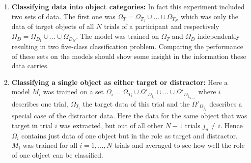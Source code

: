 \begin{enumerate}
	\item \textbf{Classifying data into object categories:} In fact this experiment included two sets of data. The first one was $ \Omega_{T} = \Omega_{T_{1}} \cup \hdots \cup \Omega_{T_{N}}$ which was only the data of target objects of all $ N $ trials of a participant and respectively $ \Omega_{D} = \Omega_{D_{1}} \cup \hdots \cup \Omega_{D_{N}}$. The model was trained on $ \Omega_{T} $ and $ \Omega_{D} $ independently resulting in two five-class classification problem. Comparing the performance of these sets on the models should show some insight in the information these data carries.
	
	\item \textbf{Classifying a single object as either target or distractor:} Here a model $ M_{i} $ was trained on a set $\Omega_{i} = \Omega_{T_{i}} \cup \Omega'_{D_{j_{1}}} \cup \hdots \cup \Omega'_{D_{j_{N-1}}} $ where $ i $ describes one trial, $ \Omega_{T_{i}} $ the target data of this trial and the $ \Omega'_{D_{j_{n}}} $ describes a special case of the distractor data. Here the data for the same object that was target in trial $ i $ was extracted, but out of all other $ N-1 $ trials $ j_{n} \neq i $. Hence $ \Omega_{i} $ contains just data of one object but in the role as target and distractor. $ M_{i} $ was trained for all $i = 1,...,N $ trials and averaged to see how well the role of one object can be classified.
	

\end{enumerate}
